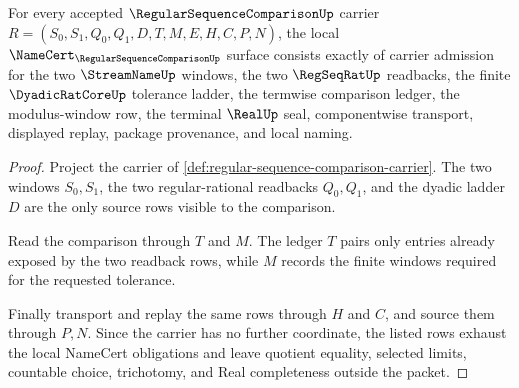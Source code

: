\begin{theorem}
\label{thm:regular-sequence-comparison-namecert-obligations}
For every accepted $\RegularSequenceComparisonUp$ carrier $R=(S_0,S_1,Q_0,Q_1,D,T,M,E,H,C,P,N)$, the local $\NameCert_{\RegularSequenceComparisonUp}$ surface consists exactly of carrier admission for the two $\StreamNameUp$ windows, the two $\RegSeqRatUp$ readbacks, the finite $\DyadicRatCoreUp$ tolerance ladder, the termwise comparison ledger, the modulus-window row, the terminal $\RealUp$ seal, componentwise transport, displayed replay, package provenance, and local naming.
\end{theorem}
\begin{proof}
Project the carrier of \autoref{def:regular-sequence-comparison-carrier}. The two windows $S_0,S_1$, the two regular-rational readbacks $Q_0,Q_1$, and the dyadic ladder $D$ are the only source rows visible to the comparison.

Read the comparison through $T$ and $M$. The ledger $T$ pairs only entries already exposed by the two readback rows, while $M$ records the finite windows required for the requested tolerance.

Finally transport and replay the same rows through $H$ and $C$, and source them through $P,N$. Since the carrier has no further coordinate, the listed rows exhaust the local NameCert obligations and leave quotient equality, selected limits, countable choice, trichotomy, and Real completeness outside the packet.
\end{proof}

